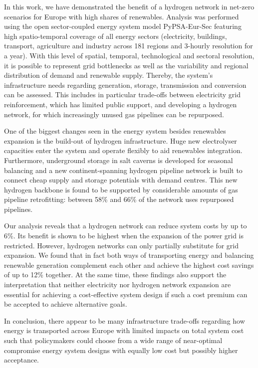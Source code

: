 In this work, we have demonstrated the benefit of a hydrogen network in net-zero
\co scenarios for Europe with high shares of renewables. Analysis was performed
using the open sector-coupled energy system model PyPSA-Eur-Sec featuring high
spatio-temporal coverage of all energy sectors (electricity, buildings,
transport, agriculture and industry across 181 regions and 3-hourly resolution
for a year). With this level of spatial, temporal, technological and sectoral
resolution, it is possible to represent grid bottlenecks as well as the
variability and regional distribution of demand and renewable supply. Thereby,
the system's infrastructure needs regarding generation, storage, transmission
and conversion can be assessed. This includes in particular trade-offs between
electricity grid reinforcement, which has limited public support, and developing
a hydrogen network, for which increasingly unused gas pipelines can be
repurposed.

One of the biggest changes seen in the energy system besides renewables
expansion is the build-out of hydrogen infrastructure. Huge new electrolyser
capacities enter the system and operate flexibly to aid renewables integration.
Furthermore, underground storage in salt caverns is developed for seasonal
balancing and a new continent-spanning hydrogen pipeline network is built to
connect cheap supply and storage potentials with demand centres. This new
hydrogen backbone is found to be supported by considerable amounts of gas
pipeline retrofitting: between 58\% and 66\% of the network uses repurposed
pipelines.

Our analysis reveals that a hydrogen network can reduce system costs by up to
6\%. Its benefit is shown to be highest when the expansion of the power grid is
restricted. However, hydrogen networks can only partially substitute for grid
expansion. We found that in fact both ways of transporting energy and balancing
renewable generation complement each other and achieve the highest cost savings
of up to 12\% together. At the same time, these findings also support the
interpretation that neither electricity nor hydrogen network expansion are
essential for achieving a cost-effective system design if such a cost premium
can be accepted to achieve alternative goals.

In conclusion, there appear to be many infrastructure trade-offs regarding how
energy is transported across Europe with limited impacts on total system cost
such that policymakers could choose from a wide range of near-optimal compromise
energy system designs with equally low cost but possibly higher acceptance.

